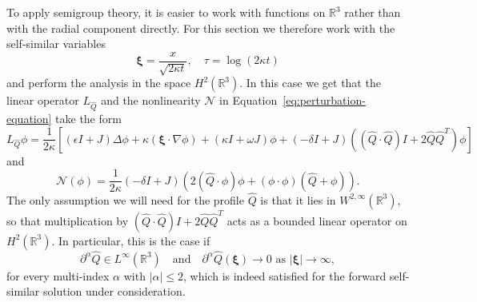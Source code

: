 \documentclass[11pt]{article}
\begin{document}
To apply semigroup theory, it is easier to work with functions on
\(\mathbb{R}^{3}\) rather than with the radial component directly. For
this section we therefore work with the self-similar
variables
\begin{equation*}
  \bm{\xi} = \frac{x}{\sqrt{2\kappa t}},\quad \tau = \log(2\kappa t)
\end{equation*}
and perform the analysis in the space \(H^{2}(\mathbb{R}^{3})\).
In this case we get that the linear operator \(L_{\hat{Q}}\) and the
nonlinearity \(\mathcal{N}\) in
Equation~\eqref{eq:perturbation-equation} take the form
\begin{equation}\label{eq:L_Q-hat-R3}
  L_{\hat{Q}}\phi = \frac{1}{2\kappa}\left[
  (\epsilon I + J)\Delta\phi
  + \kappa(\bm{\xi} \cdot \nabla\phi)
  + (\kappa I + \omega J)\phi
  + (-\delta I + J)((\hat{Q}\cdot\hat{Q})I + 2\hat{Q}\hat{Q}^{T})\phi
  \right]
\end{equation}
and
\begin{equation}\label{eq:N-R3}
  \mathcal{N}(\phi) = \frac{1}{2\kappa}(-\delta I + J)
  \left(2(\hat{Q} \cdot \phi)\phi + (\phi\cdot\phi)(\hat{Q} + \phi)\right).
\end{equation}
The only assumption we will need for the profile \(\hat{Q}\) is that
it lies in \(W^{2,\infty}(\mathbb{R}^{3})\), so that multiplication by
\((\hat{Q}\cdot\hat{Q})I + 2\hat{Q}\hat{Q}^{T}\) acts as a bounded
linear operator on \(H^{2}(\mathbb{R}^{3})\). In particular, this is
the case if
\begin{equation}\label{eq:Q-hat-decay-assumption}
  \partial^{\alpha}\hat{Q} \in L^{\infty}(\mathbb{R}^{3})
  \quad\text{and}\quad
  \partial^{\alpha}\hat{Q}(\bm{\xi}) \to 0 \text{ as } |\bm{\xi}| \to \infty,
\end{equation}
for every multi-index \(\alpha\) with \(|\alpha| \leq 2\), which is
indeed satisfied for the forward self-similar solution under
consideration.
\end{document}
